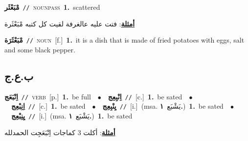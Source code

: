 \documentclass[10pt,a4paper,twoside]{article} %
\begin{document}
\begin{multicols}{2}
{\setlength\topsep{0pt}\textbf{\foreignlanguage{arabic}{مْبَعْثَر}}\ {\color{gray}\texttt{//}\color{black}}\ \textsc{noun\textunderscore pass}\ \textbf{1.}~scattered\  \begin{flushright}\color{gray}\foreignlanguage{arabic}{\textbf{\underline{\foreignlanguage{arabic}{أمثلة}}}: فتت عليه عالغرفة لقيت كل كتبه مْبَعْثَرة}\end{flushright}\color{black}} \vspace{2mm}

{\setlength\topsep{0pt}\textbf{\foreignlanguage{arabic}{مْبَعْثَرَة}}\ {\color{gray}\texttt{//}\color{black}}\ \textsc{noun}\ [f.]\ \textbf{1.}~it is a dish that is made of fried potatoes with eggs, salt and some black pepper.\ } \vspace{2mm}

\vspace{-3mm}
\subsection*{\color{blue}\foreignlanguage{arabic}{ب.ع.ج}\color{blue}{}} 

{\setlength\topsep{0pt}\textbf{\foreignlanguage{arabic}{اِنْبَعَج}}\ {\color{gray}\texttt{//}\color{black}}\ \textsc{verb}\ [p.]\ \textbf{1.}~be full\ \ $\bullet$\ \ \setlength\topsep{0pt}\textbf{\foreignlanguage{arabic}{اِنْبِعِج}}\ {\color{gray}\texttt{//}\color{black}}\ [c.]\ \textbf{1.}~be sated\ \ $\bullet$\ \ \setlength\topsep{0pt}\textbf{\foreignlanguage{arabic}{اِنِبْعِج}}\ {\color{gray}\texttt{//}\color{black}}\ [c.]\ \textbf{1.}~be sated\ \ $\bullet$\ \ \setlength\topsep{0pt}\textbf{\foreignlanguage{arabic}{يِنْبِعِج}}\ {\color{gray}\texttt{//}\color{black}}\ [i.]\ \color{gray}(msa. \foreignlanguage{arabic}{يَشْبَع}~\foreignlanguage{arabic}{\textbf{١.}})\color{black}\ \textbf{1.}~be sated\ \ $\bullet$\ \ \setlength\topsep{0pt}\textbf{\foreignlanguage{arabic}{يِنِبْعِج}}\ {\color{gray}\texttt{//}\color{black}}\ [i.]\ \color{gray}(msa. \foreignlanguage{arabic}{يَشْبَع}~\foreignlanguage{arabic}{\textbf{١.}})\color{black}\ \textbf{1.}~be sated\  \begin{flushright}\color{gray}\foreignlanguage{arabic}{\textbf{\underline{\foreignlanguage{arabic}{أمثلة}}}: أكلت 3 كماجات اِنْبَعَجِت الحمدلله}\end{flushright}\color{black}} \vspace{2mm}


\end{multicols}
\end{document}
